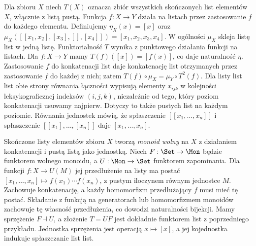 \begin{przyklad}\label{przyklad:list-monad}
Dla zbioru $X$ niech $T(X)$ oznacza zbiór wszystkich skończonych list elementów $X$, włącznie z listą pustą. Funkcja $f:X\to Y$ działa na listach przez zastosowanie $f$ do każdego elementu. Definiujemy $\eta_X(x)=[x]$ oraz $\mu_X([[x_1,x_2],[x_3],[],[x_4]])=[x_1,x_2,x_3,x_4]$. W ogólności $\mu_X$ skleja listę list w jedną listę. Funktorialność $T$ wynika z punktowego działania funkcji na listach. Dla $f:X\to Y$ mamy $T(f)([x])=[f(x)]$, co daje naturalność $\eta$. Zastosowanie $f$ do konkatenacji list daje konkatenację list otrzymanych przez zastosowanie $f$ do każdej z nich; zatem $T(f)\circ\mu_X=\mu_Y\circ T^2(f)$. Dla listy list list obie strony równania łączności wypisują elementy $x_{ijk}$ w kolejności leksykograficznej indeksów $(i,j,k)$, niezależnie od tego, który poziom konkatenacji usuwamy najpierw. Dotyczy to także pustych list na każdym poziomie. Równania jednostek mówią, że spłaszczenie $[[x_1,\ldots,x_n]]$ i spłaszczenie $[[x_1],\ldots,[x_n]]$ daje $[x_1,\ldots,x_n]$.
\end{przyklad}

\begin{przyklad}
Skończone listy elementów zbioru $X$ tworzą \emph{monoid wolny} na $X$ z działaniem konkatenacji i pustą listą jako jednostką. Niech $F:\Set\to\Mon$ będzie funktorem wolnego monoidu, a $U:\Mon\to\Set$ funktorem zapominania. Dla funkcji $f:X\to U(M)$ jej przedłużenie na listy ma postać $[x_1,\ldots,x_n]\mapsto f(x_1)\cdots f(x_n)$, z pustym iloczynem równym jednostce $M$. Zachowuje konkatenację, a każdy homomorfizm przedłużający $f$ musi mieć tę postać. Składanie z funkcją na generatorach lub homomorfizmem monoidów zachowuje tę własność przedłużenia, co dowodzi naturalności bijekcji. Mamy sprzężenie $F\dashv U$, a złożenie $T=UF$ jest dokładnie funktorem list z poprzedniego przykładu. Jednostka sprzężenia jest operacją $x\mapsto[x]$, a jej kojednostka indukuje spłaszczanie list list.
\end{przyklad}


